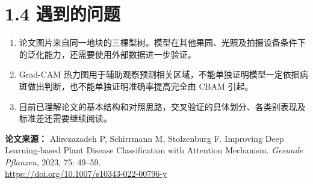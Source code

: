\documentclass[UTF8,11pt,fontset=windows]{ctexart}
\begin{document}
\section{1.4 遇到的问题}
\begin{enumerate}
\item 论文图片来自同一地块的三棵梨树。模型在其他果园、光照及拍摄设备条件下的泛化能力，还需要使用外部数据进一步验证。
\item Grad-CAM 热力图用于辅助观察预测相关区域，不能单独证明模型一定依据病斑做出判断，也不能单独证明准确率提高完全由 CBAM 引起。
\item 目前已理解论文的基本结构和对照思路，交叉验证的具体划分、各类别表现及标准差还需要继续阅读。
\end{enumerate}
\noindent\textbf{论文来源：} Alirezazadeh P, Schirrmann M, Stolzenburg F. Improving Deep Learning-based Plant Disease Classification with Attention Mechanism. \textit{Gesunde Pflanzen}, 2023, 75: 49--59.\\
\noindent\url{https://doi.org/10.1007/s10343-022-00796-y}
\end{document}
